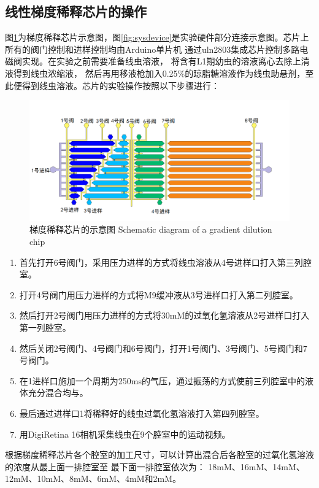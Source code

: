 \subsection{线性梯度稀释芯片的操作}
	图\ref{fig:chap5:chip}为梯度稀释芯片示意图，图\ref{fig:sysdevice}是实验硬件部分连接示意图。芯片上所有的阀门控制和进样控制均由Arduino单片机
	通过uln2803集成芯片控制多路电磁阀实现。在实验之前需要准备线虫溶液，
	将含有L1期幼虫的溶液离心去除上清液得到线虫浓缩液，
	然后再用移液枪加入0.25\%的琼脂糖溶液作为线虫助悬剂，至此便得到线虫溶液。芯片的实验操作按照以下步骤进行：
	\begin{figure}[!t]
	  \centering
	  \includegraphics[width=14cm]{figure/chap5/chip.png}
	  \bicaption
		{梯度稀释芯片的示意图}
		{Schematic diagram of a gradient dilution chip}
	  \label{fig:chap5:chip}
	\end{figure}

	
	\begin{enumerate}[label={(\arabic*)},font={\color{black!50!black}\bfseries}]
	\item 首先打开6号阀门，采用压力进样的方式将线虫溶液从4号进样口打入第三列腔室。
	\item 打开4号阀门用压力进样的方式将M9缓冲液从3号进样口打入第二列腔室。
	\item 然后打开2号阀门用压力进样的方式将30mM的过氧化氢溶液从2号进样口打入第一列腔室。
	\item 然后关闭2号阀门、4号阀门和6号阀门，打开1号阀门、3号阀门、5号阀门和7号阀门。
	\item 在1进样口施加一个周期为250ms的气压，通过振荡的方式使前三列腔室中的液体充分混合均与。
	\item 最后通过进样口1将稀释好的线虫过氧化氢溶液打入第四列腔室。
	\item 用DigiRetina 16相机采集线虫在9个腔室中的运动视频。
	\end{enumerate}
	根据梯度稀释芯片各个腔室的加工尺寸，可以计算出混合后各腔室的过氧化氢溶液的浓度从最上面一排腔室至
	最下面一排腔室依次为：
	18mM、16mM、14mM、12mM、10mM、8mM、6mM、4mM和2mM。

